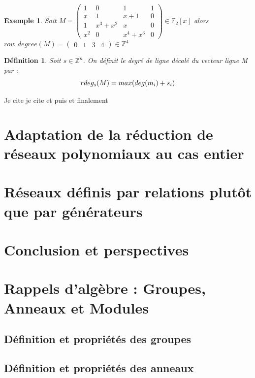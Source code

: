 \documentclass[a4paper,12pt]{report}  %
\theoremstyle{definitionstyle}
\newtheorem{definition}{Définition}[chapter] %
\theoremstyle{examplestyle}
\newtheorem{example}{Exemple}[chapter] %
\theoremstyle{remarkstyle}
\theoremstyle{propositionstyle}
\begin{document}
	\begin{example}
		Soit $M =
		\left(\begin{array}{rrrr}
			1 & 0 & 1 & 1 \\
			x & 1 & x + 1 & 0 \\
			1 & x^{3} + x^{2} & x & 0 \\
			x^{2} & 0 & x^{4} + x^{3} & 0
		\end{array}\right) \in \mathbb{F}_2[x]
		$
		alors $row\_degree(M)=\left(\begin{array}{rrrr}
			0 & 1 & 3 & 4
		\end{array}\right)\in \mathbb{Z}^4$
		
	\end{example}
	
	\begin{definition}
		Soit $s \in \mathbb{Z}^n$. On définit le degré de ligne décalé du vecteur ligne M par :
		$$rdeg_s(M)=max(deg(m_i)+s_i\\)$$
	\end{definition}

	Je cite \cite{clef_unique_1}  je cite \cite{clef_unique_2} et puis \cite{clef_unique_3} et finalement \cite{clef_unique_4}
	
	\chapter{Adaptation de la réduction de réseaux polynomiaux au cas entier}
	
	\chapter{Réseaux définis par relations plutôt que par générateurs}
	\chapter*{Conclusion et perspectives}
	
	\appendix
	\chapter{Rappels d'algèbre : Groupes, Anneaux et Modules}

	\section{Définition et propriétés des groupes}
	
	\section{Définition et propriétés des anneaux}
\end{document}
